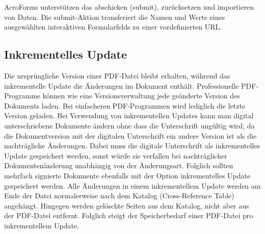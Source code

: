 \cite{schneeberger} AcroForms unterstützen das abschicken (submit), zurücksetzen und importieren von Daten. Die submit-Aktion transferiert die Namen und Werte eines ausgewählten interaktiven Formularfelds zu einer vordefinierten URL.

\subsection{Inkrementelles Update}
Die ursprüngliche Version einer PDF-Datei bleibt erhalten, während das inkrementelle Update die Änderungen im Dokument enthält. Professionelle PDF-Programme können wie eine Versionsverwaltung jede geänderte Version des Dokuments laden. Bei einfacheren PDF-Programmen wird lediglich die letzte Version geladen. Bei Verwendung von inkrementellen Updates kann man digital unterschriebene Dokumente ändern ohne dass die Unterschrift ungültig wird, da die Dokumentversion mit der digitalen Unterschrift ein andere Version ist als die nachträgliche Änderungen. Dabei muss die digitale Unterschrift als inkrementelles Update gespeichert werden, sonst würde sie verfallen bei nachträglicher Dokumentenänderung unabhängig von der Änderungsart. Folglich sollten mehrfach signierte Dokumente ebenfalls mit der Option inkrementelles Update gespeichert werden. \cite{softx} Alle Änderungen in einem inkrementellem Update werden am Ende der Datei normalerweise nach dem Katalog (Cross-Reference Table) angehängt. Hingegen werden gelöschte Seiten aus dem Katalog, nicht aber aus der PDF-Datei entfernt. Folglich steigt der Speicherbedarf einer PDF-Datei pro inkrementellem Update. \cite{schneeberger} 

